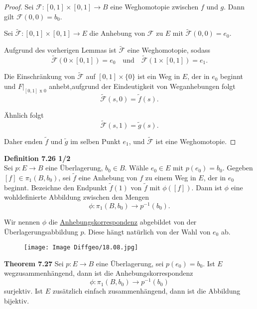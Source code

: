 \documentclass[fleqn, 12pt, letterpaper]{article}
\begin{document}
\begin{proof}
Sei \( \mathcal{F} : [0,1] \times [0,1] \to B \) eine Weghomotopie zwischen \( f \) und \( g \). Dann gilt \( \mathcal{F}(0,0) = b_0 \).

Sei \( \widetilde{\mathcal{F}} : [0,1] \times [0,1] \to E \) die Anhebung von \( \mathcal{F} \) zu \( E \) mit \( \widetilde{\mathcal{F}}(0,0) = e_0 \). 

Aufgrund des vorherigen Lemmas ist \( \widetilde{\mathcal{F}} \) eine Weghomotopie, sodass 
\[
\widetilde{\mathcal{F}}(0 \times [0,1]) = {e_0} \quad \text{und} \quad \widetilde{\mathcal{F}}(1 \times [0,1]) = {e_1}.
\]

Die Einschränkung von \( \widetilde{\mathcal{F}} \) auf \( [0,1] \times \{0\} \) ist ein Weg in \( E \), der in \( e_0 \) beginnt und $F|_{[0,1]\text{ x } {0}}$ anhebt,aufgrund der Eindeutigkeit von Weganhebungen folgt 
\[
\widetilde{\mathcal{F}}(s,0) = \widetilde{f}(s).
\]

Ähnlich folgt
\[
\widetilde{\mathcal{F}}(s,1) = \widetilde{g}(s).
\]

Daher enden \( \widetilde{f} \) und \( \widetilde{g} \) im selben Punkt $e_1$, und \( \widetilde{\mathcal{F}} \) ist eine Weghomotopie.
\end{proof}
\vspace{1em}

\textbf{Definition 7.26 1/2}\\
Sei \( p : E \to B \) eine Überlagerung, \( b_0 \in B \). Wähle \( e_0 \in E \) mit \( p(e_0) = b_0 \). Gegeben \( [f] \in \pi_1(B, b_0) \), sei \( \widetilde{f} \) eine Anhebung von \( f \) zu einem Weg in \( E \), der in \( e_0 \) beginnt. Bezeichne den Endpunkt \( \widetilde{f}(1) \) von \( \widetilde{f} \) mit \( \phi([f]) \). Dann ist \( \phi \) eine wohldefinierte Abbildung zwischen den Mengen
\[
\phi : \pi_1(B, b_0) \longrightarrow p^{-1}(b_0).
\]

Wir nennen \( \phi \) die \underline{Anhebungskorrespondenz} abgebildet von der Überlagerungsabbildung \( p \). Diese hängt natürlich von der Wahl von \( e_0 \) ab.
 \begin{figure}[H]
    \centering
    \texttt{[image: Image Diffgeo/18.08.jpg]}
 \end{figure}


\textbf{Theorem 7.27}
Sei \( p : E \to B \) eine Überlagerung, sei \( p(e_0) = b_0 \). Ist \( E \) wegzusammenhängend, dann ist die Anhebungskorrespondenz
\[
\phi : \pi_1(B, b_0) \longrightarrow p^{-1}(b_0)
\]
surjektiv. Ist \( E \) zusätzlich einfach zusammenhängend, dann ist die Abbildung bijektiv.
\end{document}
